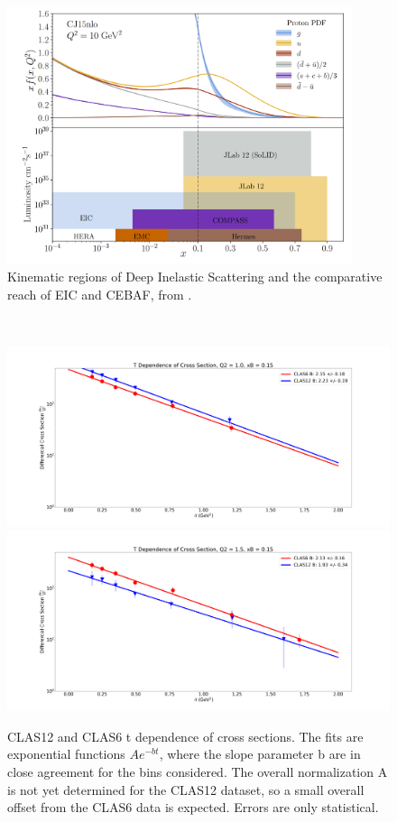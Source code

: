    \begin{figure}
        \centering
        \includegraphics[width=0.9\textwidth]{Chapters/Ch5-Further/X_conclusion/pics/future.png}
        \caption[Kinematic Overlap of Future Experiments]{Kinematic regions of Deep Inelastic Scattering and the comparative reach of EIC and CEBAF, from \parencite{Arrington2022PhysicsOpportunities}. }
        \label{fig:physics_future_ranges}
    \end{figure}












\iffalse

    \
    \begin{figure}[hbt]
    	\centering
    	\includegraphics[page=125,width=0.45\linewidth]{Chapters/Ch5-Further/t_dependence/pics/fig_1.0_0.15.png}
    	\includegraphics[page=130,width=0.45\linewidth]{Chapters/Ch5-Further/t_dependence/pics/fig_1.5_0.15.png}
    
    	\caption[t dependence]{CLAS12 and CLAS6 t dependence of cross sections. The fits are exponential functions $Ae^{-bt}$, where the slope parameter b are in close agreement for the bins considered. The overall normalization A is not yet determined for the CLAS12 dataset, so a small overall offset from the CLAS6 data is expected. Errors are only statistical.}
    	\label{fig:tdep}
    \end{figure}
    \

